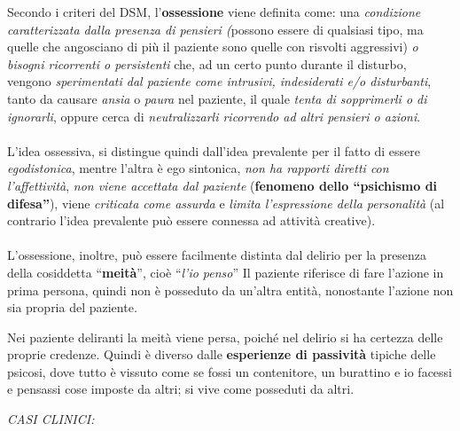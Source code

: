 Secondo i criteri del DSM, l'\textbf{ossessione} viene definita come:
una \emph{condizione caratterizzata dalla presenza di pensieri (}possono
essere di qualsiasi tipo, ma quelle che angosciano di più il paziente
sono quelle con risvolti aggressivi) \emph{o bisogni ricorrenti o
persistenti} che, ad un certo punto durante il disturbo, vengono
\emph{sperimentati dal paziente come intrusivi, indesiderati e/o
disturbanti}, tanto da causare \emph{ansia} o \emph{paura} nel paziente,
il quale \emph{tenta di sopprimerli o di ignorarli}, oppure cerca di
\emph{neutralizzarli ricorrendo ad altri pensieri o azioni}.
\\\\
L'idea ossessiva, si distingue quindi dall'idea prevalente per il fatto
di essere \emph{egodistonica}, mentre l'altra è ego sintonica, \emph{non
ha rapporti diretti con l'affettività}, \emph{non viene accettata dal
paziente} (\textbf{fenomeno dello ``psichismo di difesa''}), viene
\emph{criticata come assurda} e \emph{limita l'espressione della
personalità} (al contrario l'idea prevalente può essere connessa ad
attività creative).
\\\\
L'ossessione, inoltre, può essere facilmente distinta dal delirio per la
presenza della cosiddetta ``\textbf{meità}'', cioè ``\emph{l'io penso}''
Il paziente riferisce di fare l'azione in prima persona, quindi non è
posseduto da un'altra entità, nonostante l'azione non sia propria del
paziente.

Nei paziente deliranti la meità viene persa, poiché nel delirio si ha
certezza delle proprie credenze. Quindi è diverso dalle
\textbf{esperienze di passività} tipiche delle psicosi, dove tutto è
vissuto come se fossi un contenitore, un burattino e io facessi e
pensassi cose imposte da altri; si vive come posseduti da altri.

\emph{\emph{CASI CLINICI:}}

